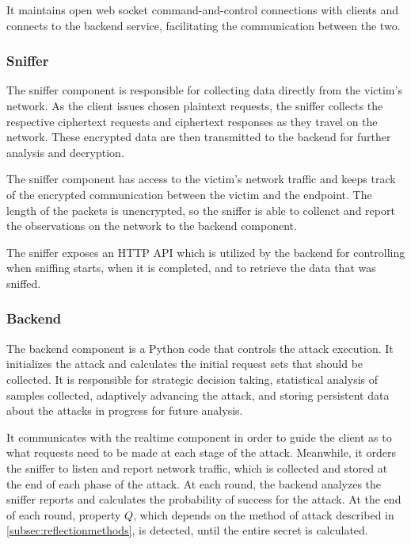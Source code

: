 \documentclass[conference, letterpaper, 10pt]{IEEEtran}
\begin{document}
It maintains open web socket command-and-control connections with clients and
connects to the backend service, facilitating the communication between the two.

\subsubsection{Sniffer}

The sniffer component is responsible for collecting data directly from the
victim's network. As the client issues chosen plaintext requests, the sniffer
collects the respective ciphertext requests and ciphertext responses as they
travel on the network. These encrypted data are then transmitted to the backend
for further analysis and decryption.

The sniffer component has access to the victim's network traffic and
keeps track of the encrypted communication between the victim and the endpoint.
The length of the packets is unencrypted, so the sniffer is able to collenct and
report the observations on the network to the backend component.

The sniffer exposes an HTTP API which is utilized by the backend for controlling
when sniffing starts, when it is completed, and to retrieve the data that was
sniffed.

\subsubsection{Backend}

The backend component is a Python code that controls the attack execution. It
initializes the attack and calculates the initial request sets that should be
collected. It is responsible for strategic decision taking, statistical
analysis of samples collected, adaptively advancing the attack, and storing
persistent data about the attacks in progress for future analysis.

It communicates with the realtime component in order to guide the client as to
what requests need to be made at each stage of the attack. Meanwhile, it orders
the sniffer to listen and report network traffic, which is collected and stored
at the end of each phase of the attack. At each round, the backend analyzes the
sniffer reports and calculates the probability of success for the attack. At the
end of each round, property $Q$, which depends on the method of attack described
in \ref{subsec:reflectionmethods}, is detected, until the entire secret is
calculated.
\end{document}
